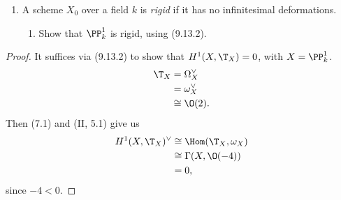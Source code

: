 \documentclass[12pt]{amsart}
\begin{document}
\begin{enumerate}
  \item[9.10.] {
      A scheme $X_0$ over a field $k$ is \emph{rigid} if it has no infinitesimal deformations.
      \begin{enumerate}
        \item Show that $\PP_k^1$ is rigid, using (9.13.2).
      \end{enumerate}
    }
\end{enumerate}

\begin{proof}
  It suffices via (9.13.2) to show that $H^1(X,\T_X)=0$, with $X=\PP_k^1$.
  \begin{align*}
    \T_X &=\Omega_X^\vee \\
         &=\omega_X^\vee \\
         &\cong \O(2).
  \end{align*}
  Then (7.1) and (II, 5.1) give us
  \begin{align*}
    H^1(X,\T_X)^\vee &\cong \Hom(\T_X,\omega_X) \\
                     &\cong \Gamma(X,\O(-4)) \\
                     &= 0,
  \end{align*}
  since $-4<0$.
\end{proof}
\end{document}
